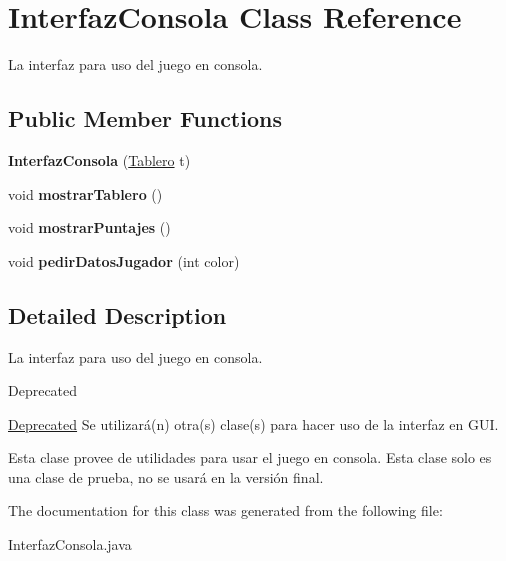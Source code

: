 \hypertarget{class_interfaz_consola}{}\section{Interfaz\+Consola Class Reference}
\label{class_interfaz_consola}


La interfaz para uso del juego en consola.  


\subsection*{Public Member Functions}
\begin{DoxyCompactItemize}
\item 
\mbox{\label{class_interfaz_consola_a3cff2fef8efc00be9ee226acde1109bb}} 
{\bfseries Interfaz\+Consola} (\mbox{\hyperlink{class_tablero}{Tablero}} t)
\item 
\mbox{\label{class_interfaz_consola_a9047e4b9905fc39f4a63e600224d3231}} 
void {\bfseries mostrar\+Tablero} ()
\item 
\mbox{\label{class_interfaz_consola_a00cb9941e8a29771edd197ff378cf56a}} 
void {\bfseries mostrar\+Puntajes} ()
\item 
\mbox{\label{class_interfaz_consola_a037aa565f33c71d85449aae894302611}} 
void {\bfseries pedir\+Datos\+Jugador} (int color)
\end{DoxyCompactItemize}


\subsection{Detailed Description}
La interfaz para uso del juego en consola. 

\begin{DoxyRefDesc}{Deprecated}
\item[\mbox{\hyperlink{deprecated__deprecated000001}{Deprecated}}]Se utilizará(n) otra(s) clase(s) para hacer uso de la interfaz en G\+UI. \end{DoxyRefDesc}
Esta clase provee de utilidades para usar el juego en consola. Esta clase solo es una clase de prueba, no se usará en la versión final. 

The documentation for this class was generated from the following file\+:\begin{DoxyCompactItemize}
\item 
Interfaz\+Consola.\+java\end{DoxyCompactItemize}
